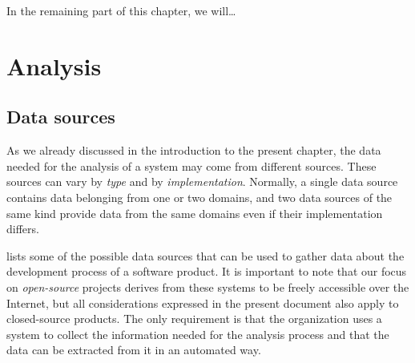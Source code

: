 In the remaining part of this chapter, we will\ldots\\



\section{Analysis}
\label{sec:acquisition/analysis}

\subsection{Data sources}
\label{sec:acquisition/analysis/sources}

As we already discussed in the introduction to the present chapter, the data needed for the analysis of a system may come from different sources. These sources can vary by \emph{type} and by \emph{implementation}. Normally, a single data source contains data belonging from one or two domains, and two data sources of the same kind provide data from the same domains even if their implementation differs.

 lists some of the possible data sources that can be used to gather data about the development process of a software product. It is important to note that our focus on \emph{open-source} projects derives from these systems to be freely accessible over the Internet, but all considerations expressed in the present document also apply to closed-source products. The only requirement is that the organization uses a system to collect the information needed for the analysis process and that the data can be extracted from it in an automated way.

